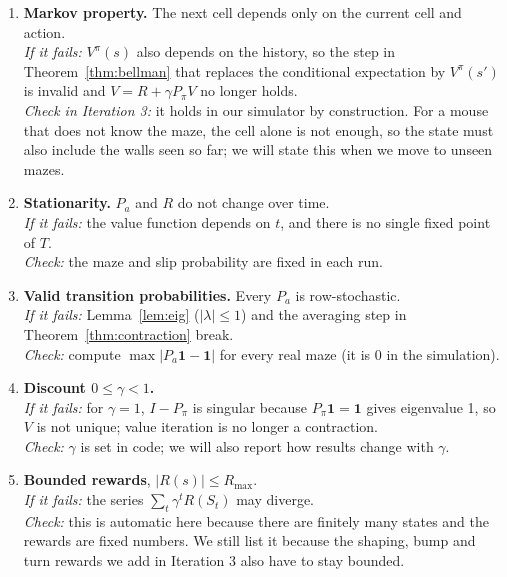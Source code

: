 \documentclass[10pt]{article}
\theoremstyle{definition}
\newcommand{\one}{\mathbf{1}}
\begin{document}
\begin{enumerate}[label=\textbf{A\arabic*.}, leftmargin=2.2em, itemsep=6pt]
\item \textbf{Markov property.} The next cell depends only on the current cell and action.\\
\emph{If it fails:} $V^\pi(s)$ also depends on the history, so the step in Theorem~\ref{thm:bellman} that replaces the conditional expectation by $V^\pi(s')$ is invalid and $V = R+\gamma P_\pi V$ no longer holds.\\
\emph{Check in Iteration 3:} it holds in our simulator by construction. For a mouse that does not know the maze, the cell alone is not enough, so the state must also include the walls seen so far; we will state this when we move to unseen mazes.

\item \textbf{Stationarity.} $P_a$ and $R$ do not change over time.\\
\emph{If it fails:} the value function depends on $t$, and there is no single fixed point of $T$.\\
\emph{Check:} the maze and slip probability are fixed in each run.

\item \textbf{Valid transition probabilities.} Every $P_a$ is row-stochastic.\\
\emph{If it fails:} Lemma~\ref{lem:eig} ($|\lambda|\le 1$) and the averaging step in Theorem~\ref{thm:contraction} break.\\
\emph{Check:} compute $\max|P_a\one - \one|$ for every real maze (it is 0 in the simulation).

\item \textbf{Discount $0\le\gamma<1$.}\\
\emph{If it fails:} for $\gamma = 1$, $I-P_\pi$ is singular because $P_\pi\one = \one$ gives eigenvalue 1, so $V$ is not unique; value iteration is no longer a contraction.\\
\emph{Check:} $\gamma$ is set in code; we will also report how results change with $\gamma$.

\item \textbf{Bounded rewards}, $|R(s)|\le R_{\max}$.\\
\emph{If it fails:} the series $\sum_t\gamma^tR(S_t)$ may diverge.\\
\emph{Check:} this is automatic here because there are finitely many states and the rewards are fixed numbers. We still list it because the shaping, bump and turn rewards we add in Iteration 3 also have to stay bounded.


\end{enumerate}
\end{document}
